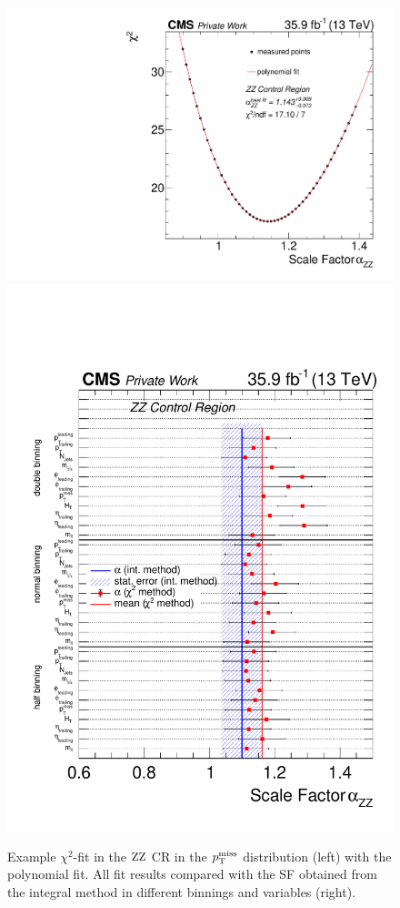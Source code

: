 \begin{figure}[tbp]
 \centering
 \includegraphics[width=\pairwidth]{figures/plots_CR/chi/ZZ_met}
 \includegraphics[width=\pairwidth]{figures/plots_CR/chi/ZZ_Compare}
 \caption{Example $\chi^2$-fit in the $\mathrm{Z}\mathrm{Z}$ CR in the $p_{\mathrm{T}}^\text{miss}$ distribution (left) with the polynomial fit. All fit results compared with the SF obtained from the integral method in different binnings and variables (right).}
 \label{fig:chiZZ}
\end{figure}

